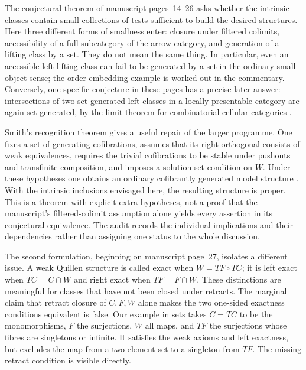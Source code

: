 The conjectural theorem of manuscript pages~14--26 asks whether the
intrinsic classes contain small collections of tests sufficient to build
the desired structures. Here three different forms of smallness enter:
closure under filtered colimits, accessibility of a full subcategory of the
arrow category, and generation of a lifting class by a set. They do not
mean the same thing. In particular, even an accessible left lifting class
can fail to be generated by a set in the ordinary small-object sense; the
order-embedding example is worked out in the commentary. Conversely, one
specific conjecture in these pages has a precise later answer: intersections
of two set-generated left classes in a locally presentable category are
again set-generated, by the limit theorem for combinatorial cellular
categories \citep[Theorem~3.2 and Remark~3.8]{MakkaiRosicky2014Cellular}.

Smith's recognition theorem gives a useful repair of the larger programme.
One fixes a set of generating cofibrations, assumes that its right
orthogonal consists of weak equivalences, requires the trivial cofibrations
to be stable under pushouts and transfinite composition, and imposes a
solution-set condition on $W$. Under these hypotheses one obtains an
ordinary cofibrantly generated model structure
\citep[Theorem~1.7]{Beke2000}. With the intrinsic inclusions envisaged here,
the resulting structure is proper. This is a theorem with explicit extra
hypotheses, not a proof that the manuscript's filtered-colimit assumption
alone yields every assertion in its conjectural equivalence. The audit
records the individual implications and their dependencies rather than
assigning one status to the whole discussion.

The second formulation, beginning on manuscript page~27, isolates a
different issue. A weak Quillen structure is called exact when
$W=TF\circ TC$; it is left exact when $TC=C\cap W$ and right exact when
$TF=F\cap W$. These distinctions are meaningful for classes that have not
been closed under retracts. The marginal claim that retract closure of
$C,F,W$ alone makes the two one-sided exactness conditions equivalent is
false. Our example in sets takes $C=TC$ to be the monomorphisms, $F$ the
surjections, $W$ all maps, and $TF$ the surjections whose fibres are singletons
or infinite. It satisfies the weak axioms and left exactness, but excludes
the map from a two-element set to a singleton from $TF$. The missing
retract condition is visible directly.

